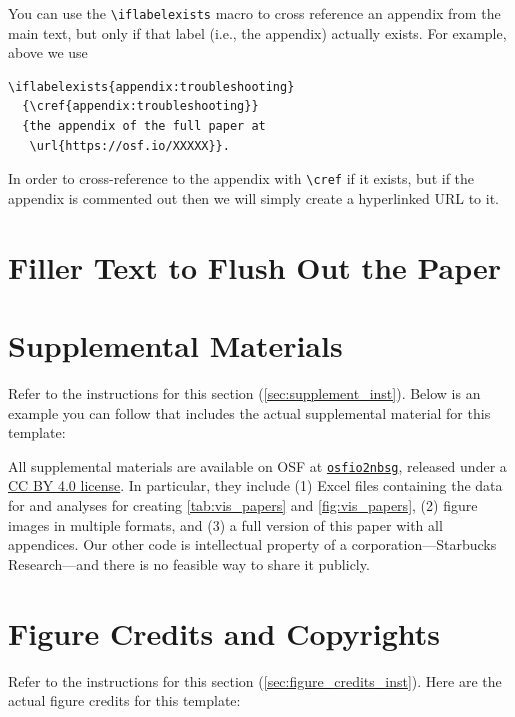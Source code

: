 \documentclass[journal]{vgtc}                     %
\begin{document}
You can use the \verb|\iflabelexists| macro to cross reference an appendix from the main text, but only if that label (i.e., the appendix) actually exists.
For example, above we use

\begin{verbatim}
\iflabelexists{appendix:troubleshooting}
  {\cref{appendix:troubleshooting}}
  {the appendix of the full paper at
   \url{https://osf.io/XXXXX}}.
\end{verbatim}

In order to cross-reference to the appendix with \verb|\cref| if it exists, but if the appendix is commented out then we will simply create a hyperlinked URL to it.


\section{Filler Text to Flush Out the Paper}

\lipsum[1-2]%


\section*{Supplemental Materials}
\label{sec:supplemental_materials}

Refer to the instructions for this section (\cref{sec:supplement_inst}).
Below is an example you can follow that includes the actual supplemental material for this template:

All supplemental materials are available on OSF at \href{https://doi.org/10.17605/OSF.IO/2NBSG}{\texttt{osfio\discretionary{/}{}{/}2nbsg}}, released under a \href{https://creativecommons.org/licenses/by/4.0/}{\ccby{} CC BY 4.0 license}.
In particular, they include (1) Excel files containing the data for and analyses for creating \cref{tab:vis_papers} and \cref{fig:vis_papers}, (2) figure images in multiple formats, and (3) a full version of this paper with all appendices.
Our other code is intellectual property of a corporation---Starbucks Research---and there is no feasible way to share it publicly.


\section*{Figure Credits and Copyrights}
\label{sec:figure_credits}

Refer to the instructions for this section (\cref{sec:figure_credits_inst}).
Here are the actual figure credits for this template:
\end{document}
